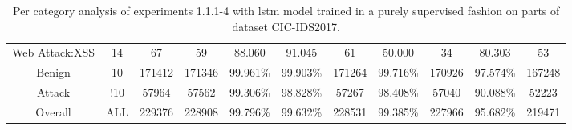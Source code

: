 \begin{table}[htb]
\begin{tabular}{@{}ccccccccccc@{}}
        Web Attack:XSS &  14 &  67 &  59 &  88.060 &  91.045 &  61 &  50.000 &  34 &  80.303 &  53 \\
        Benign &  10 &  171412 &  171346 &  99.961\% &  99.903\% &  171264 &  99.716\% &  170926 &  97.574\% &  167248 \\
        Attack &  !10 &  57964 &  57562 &  99.306\% &  98.828\% &  57267 &  98.408\% &  57040 &  90.088\% &  52223 \\
        Overall &  ALL &  229376 &  228908 &  99.796\% &  99.632\% &  228531 &  99.385\% &  227966 &  95.682\% &  219471 \\
        \bottomrule
    \end{tabular}
    \caption{Per category analysis of experiments 1.1.1-4 with \gls{lstm} model trained in a purely supervised fashion on parts of dataset CIC-IDS2017.}
    \label{table:results:lstm:class_flows_supervised}
\end{table}